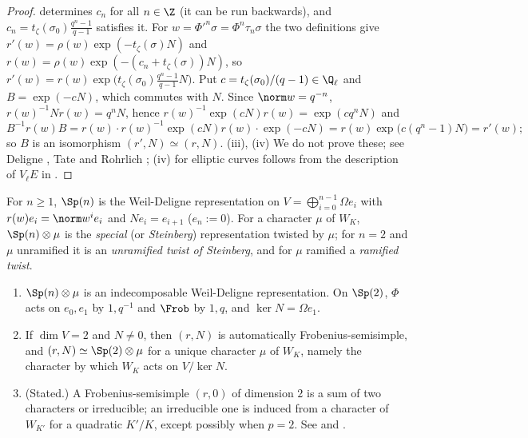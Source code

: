 \begin{proof}
determines $c_n$ for all $n\in\Z$ (it can be run backwards), and $c_n=t_\zeta(\sigma_0)\frac{q^n-1}{q-1}$ satisfies it. For $w=\Phi'^n\sigma=\Phi^n\tau_n\sigma$ the two
definitions give $r'(w)=\rho(w)\exp(-t_\zeta(\sigma)N)$ and $r(w)=\rho(w)\exp(-(c_n+t_\zeta(\sigma))N)$, so
$r'(w)=r(w)\exp\bigl(t_\zeta(\sigma_0)\frac{q^n-1}{q-1}N\bigr)$. Put $c=t_\zeta(\sigma_0)/(q-1)\in\Q_\ell$ and $B=\exp(-cN)$, which commutes with $N$. Since
$\norm w=q^{-n}$, $r(w)^{-1}Nr(w)=q^nN$, hence $r(w)^{-1}\exp(cN)r(w)=\exp(cq^nN)$ and
\[
B^{-1}r(w)B=r(w)\cdot r(w)^{-1}\exp(cN)r(w)\cdot\exp(-cN)=r(w)\exp\bigl(c(q^n-1)N\bigr)=r'(w);
\]
so $B$ is an isomorphism $(r',N)\simeq(r,N)$. (iii), (iv) We do not prove these; see Deligne \cite[Section 8]{Deligne73}, Tate \cite[Section 4.2]{Tate79}
and Rohrlich \cite{Rohrlich94}; (iv) for elliptic curves follows from the description of $V_\ell E$ in .
\end{proof}

\begin{definition}\label{def:local:sp}
For $n\ge1$, $\Sp(n)$ is the Weil-Deligne representation on $V=\bigoplus_{i=0}^{n-1}\Omega e_i$ with $r(w)e_i=\norm w^ie_i$ and $Ne_i=e_{i+1}$ ($e_n:=0$). For a
character $\mu$ of $W_K$, $\Sp(n)\otimes\mu$ is the \emph{special} (or \emph{Steinberg}) representation twisted by $\mu$; for $n=2$ and $\mu$ unramified it is an
\emph{unramified twist of Steinberg}, and for $\mu$ ramified a \emph{ramified twist}.
\end{definition}

\begin{proposition}\label{prop:local:sp}
\begin{enumerate}[label=(\roman*)]
\item $\Sp(n)\otimes\mu$ is an indecomposable Weil-Deligne representation. On $\Sp(2)$, $\Phi$ acts on $e_0,e_1$ by $1,q^{-1}$ and $\Frob$ by $1,q$, and $\ker N=\Omega e_1$.
\item If $\dim V=2$ and $N\ne0$, then $(r,N)$ is automatically Frobenius-semisimple, and $(r,N)\simeq\Sp(2)\otimes\mu$ for a unique character $\mu$ of $W_K$,
namely the character by which $W_K$ acts on $V/\ker N$.
\item (Stated.) A Frobenius-semisimple $(r,0)$ of dimension $2$ is a sum of two characters or irreducible; an irreducible one is induced from a character of
$W_{K'}$ for a quadratic $K'/K$, except possibly when $p=2$. See \cite[Section 4.1]{Tate79} and \cite{Rohrlich94}.
\end{enumerate}
\end{proposition}


